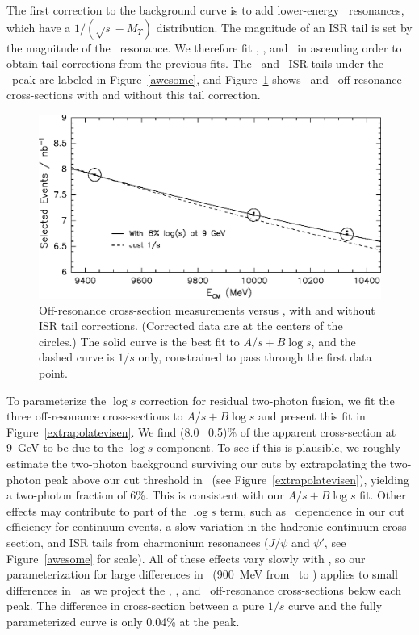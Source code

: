 \documentclass{cornell}
\begin{document}
The first correction to the background curve is to add lower-energy
\ups\ resonances, which have a $1/(\sqrt{s} - M_\Upsilon)$
distribution.  The magnitude of an ISR tail is set by the magnitude of
the \ups\ resonance.  We therefore fit \us, \uss, and \usss\ in
ascending order to obtain tail corrections from the previous fits.
The \us\ and \uss\ ISR tails under the \usss\ peak are labeled in
Figure~\ref{awesome}, and Figure~\ref{logsfit} shows \uss\ and \usss\
off-resonance cross-sections with and without this tail correction.

\begin{figure}[p]
  \begin{center}
    \includegraphics[width=\linewidth]{logsfit}
  \end{center}
  \caption[Off-resonance effective cross-section as a function of
  \ecm]{\label{logsfit} Off-resonance cross-section measurements
  versus \ecm, with and without ISR tail corrections.  (Corrected data
  are at the centers of the circles.)  The solid curve is the best fit
  to $A/s+B\log s$, and the dashed curve is $1/s$ only, constrained to
  pass through the first data point.}
\end{figure}

\label{pag:logs}
To parameterize the $\log s$ correction for residual two-photon
fusion, we fit the three off-resonance cross-sections to $A/s + B\log
s$ and present this fit in Figure~\ref{extrapolatevisen}.  We find
(8.0 \PM\ 0.5)\% of the apparent cross-section at 9~GeV to be due to
the $\log s$ component.  To see if this is plausible, we roughly
estimate the two-photon background surviving our cuts by extrapolating
the two-photon peak above our cut threshold in \visen\ (see
Figure~\ref{extrapolatevisen}), yielding a two-photon fraction of 6\%.
This is consistent with our $A/s+B\log s$ fit.  Other effects may
contribute to part of the $\log s$ term, such as \ecm\ dependence in
our cut efficiency for continuum events, a slow variation in the
hadronic continuum cross-section, and ISR tails from charmonium
resonances ($J/\psi$ and $\psi'$, see Figure~\ref{awesome} for scale).
All of these effects vary slowly with \ecm, so our parameterization
for large differences in \ecm\ (900~MeV from \us\ to \usss) applies to
small differences in \ecm\ as we project the \us, \uss, and \usss\
off-resonance cross-sections below each peak.  The difference in
cross-section between a pure $1/s$ curve and the fully parameterized
curve is only 0.04\% at the peak.
\end{document}

